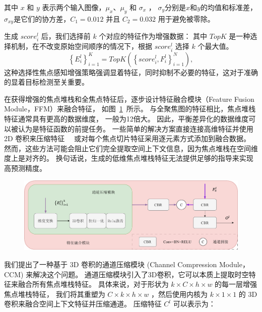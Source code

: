 其中 $x$ 和 $y$ 表示两个输入图像，$\mu_{x}$、$\mu_{y}$ 和 $\sigma_{x}$ ， $\sigma_{y}$分别是$x$和$y$的均值和标准差，$\sigma_{xy}$是它们的协方差，$C_{1} = 0.012$ 并且 $C_{2} = 0.032$ 用于避免被零除。 
%
%
%
%
\par
%
%
生成 $ score_{i}^{l} $ 后，我们选择前 $k$ 个对应的特征作为增强数据：
其中 $ TopK $ 是一种选择机制，在不改变原始空间顺序的情况下，根据 $ score_{i}^{l} $ 选择 $k$ 个最大值。 
\begin{equation}
	\left \{ E_{i}^{l} \right \}_{i=1}^{K} = TopK \left ( \left \{ score_{i}^{l}, F_{i}^{l} \right \}_{i=1}^{N} \right ), 	
\end{equation}
%
%
这种选择性焦点感知增强策略强调显着特征，同时抑制不必要的特征，这对于准确的显着目标检测至关重要。
%
%
%
%
\par
%
%
在获得增强的焦点堆栈和全焦点特征后，逐步设计特征融合模块（Feature Fusion Module，FFM）来融合特征，
如图~\ref{cpt3_fig1:ccm}~所示。
与全聚焦图的特征相比，焦点堆栈特征通常具有更高的数据维度， 一般为12倍大。 
因此，平衡差异化的数据维度可以被认为是特征函数的前提任务。
一些简单的解决方案直接连接高维特征并使用 2D 卷积来压缩特征~\cite{piao2021panet}~
或对每个焦点切片特征采用逐元素方式添加到融合数据\cite{liu2021light}。 然而，这些方法可能会阻止它们完全提取空间上下文信息，因为焦点堆栈在空间维度上是对齐的。 换句话说，生成的低维焦点堆栈特征无法提供足够的指导来实现高预测精度。 
%
%
%
%
%
\begin{figure}[!ht]
	\centering
	\includegraphics[width=0.95\linewidth]{figures/chapter3/ccm}
	\label{cpt3_fig1:ccm}
\end{figure}
%
%
%
\par
%
%
我们提出了一种基于 3D 卷积的通道压缩模块 (Channel Compression Module，CCM) 来解决这个问题。 
通道压缩模块引入了3D卷积，它可以本质上提取时空特征来融合所有焦点堆栈特征。
具体来说，对于形状为 $ k \times C \times h \times w $ 的每一层增强焦点堆栈特征，
我们将其重塑为 $ C \times  k \times  h \times w $ ，然后使用内核为 $ k \times 1 \times 1 $  的 3D 卷积来融合空间上下文特征并压缩通道。 压缩特征 $ C^{l} $ 可以表示为：
